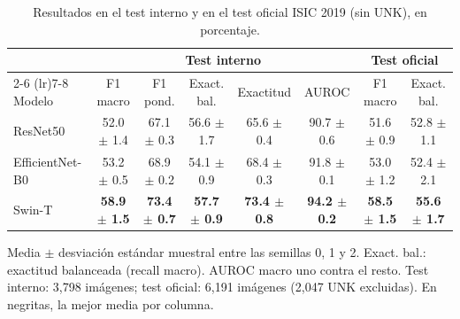 \begin{table}[t]
\centering
\caption{Resultados en el test interno y en el test oficial ISIC 2019 (sin UNK), en porcentaje.}
\label{tab:tabla1_resultados}
\footnotesize
\begin{tabular}{lccccccc}
\toprule
 & \multicolumn{5}{c}{Test interno} & \multicolumn{2}{c}{Test oficial} \\
\cmidrule(lr){2-6} \cmidrule(lr){7-8}
Modelo & F1 macro & F1 pond. & Exact. bal. & Exactitud & AUROC & F1 macro  & Exact. bal.  \\
\midrule
ResNet50 & 52.0 $\pm$ 1.4 & 67.1 $\pm$ 0.3 & 56.6 $\pm$ 1.7 & 65.6 $\pm$ 0.4 & 90.7 $\pm$ 0.6 & 51.6 $\pm$ 0.9 & 52.8 $\pm$ 1.1 \\
EfficientNet-B0 & 53.2 $\pm$ 0.5 & 68.9 $\pm$ 0.2 & 54.1 $\pm$ 0.9 & 68.4 $\pm$ 0.3 & 91.8 $\pm$ 0.1 & 53.0 $\pm$ 1.2 & 52.4 $\pm$ 2.1 \\
Swin-T & \textbf{58.9 $\pm$ 1.5} & \textbf{73.4 $\pm$ 0.7} & \textbf{57.7 $\pm$ 0.9} & \textbf{73.4 $\pm$ 0.8} & \textbf{94.2 $\pm$ 0.2} & \textbf{58.5 $\pm$ 1.5} & \textbf{55.6 $\pm$ 1.7} \\
\bottomrule
\end{tabular}
\par\vspace{2pt}
\parbox{\linewidth}{\scriptsize Media $\pm$ desviación estándar muestral entre las semillas 0, 1 y 2. Exact. bal.: exactitud balanceada (recall macro). AUROC macro uno contra el resto. Test interno: 3,798 imágenes; test oficial: 6,191 imágenes (2,047 UNK excluidas). En negritas, la mejor media por columna.}
\end{table}
